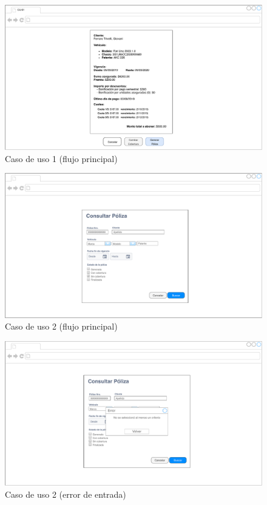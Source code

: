 \documentclass[12pt]{article}
\begin{document}
\vfill
\begin{figure}[h!]
\includegraphics[width=\textwidth]{CU1/CU-017.pdf}
\caption{Caso de uso 1 (flujo principal)}
\end{figure}
\vfill

\vfill
\begin{figure}[h!]
\includegraphics[width=\textwidth]{CU2/CU-021.pdf}
\caption{Caso de uso 2 (flujo principal)}
\end{figure}
\vfill

\vfill
\begin{figure}[h!]
\includegraphics[width=\textwidth]{CU2/CU-022.pdf}
\caption{Caso de uso 2 (error de entrada)}
\end{figure}
\vfill
\end{document}
